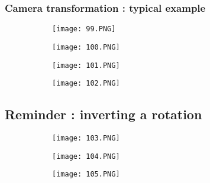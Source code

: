 \documentclass{article}
\begin{document}
\vspace{100mm}
\subsubsection{Camera transformation : typical example}

\begin{figure}[ht!]
  \centering
  \begin{subfigure}[b]{0.49\linewidth}
    \texttt{[image: 99.PNG]}
  \end{subfigure}
  \begin{subfigure}[b]{0.5\textwidth}
         \centering
         \texttt{[image: 100.PNG]}
     \end{subfigure}
\end{figure}


\begin{figure}[ht!]
  \centering
  \begin{subfigure}[b]{0.49\linewidth}
    \texttt{[image: 101.PNG]}
  \end{subfigure}
  \begin{subfigure}[b]{0.5\textwidth}
         \centering
         \texttt{[image: 102.PNG]}
     \end{subfigure}
\end{figure}

\subsection{Reminder : inverting a rotation}

\begin{figure}[ht!]
  \centering
  \begin{subfigure}[b]{0.49\linewidth}
    \texttt{[image: 103.PNG]}
  \end{subfigure}
  \begin{subfigure}[b]{0.5\textwidth}
         \centering
         \texttt{[image: 104.PNG]}
     \end{subfigure}
\end{figure}


\begin{figure}[ht!]
  \centering
  \begin{subfigure}[b]{0.3\linewidth}
    \texttt{[image: 105.PNG]}
  \end{subfigure}
\end{figure}
\end{document}

